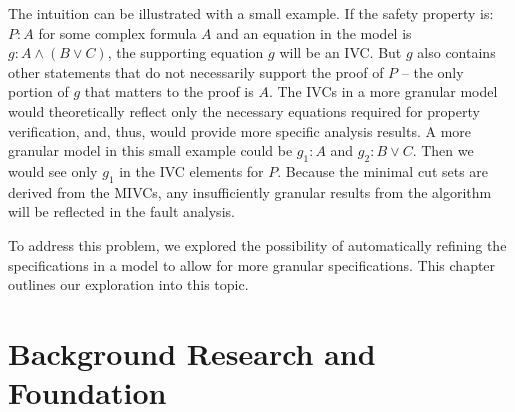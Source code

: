 The intuition can be illustrated with a small example. If the safety property is: $P : A $ for some complex formula $A$ and an equation in the model is $g: A \land (B \lor C)$, the supporting equation $g$ will be an IVC. But $g$ also contains other statements that do not necessarily support the proof of $P$ -- the only portion of $g$ that matters to the proof is $A$. The IVCs in a more granular model would theoretically reflect only the necessary equations required for property verification, and, thus, would provide more specific analysis results. A more granular model in this small example could be $g_1 : A$ and $g_2: B \lor C$. Then we would see only $g_1$ in the IVC elements for $P$. Because the minimal cut sets are derived from the MIVCs, any insufficiently granular results from the \aivcalg algorithm will be reflected in the fault analysis.


To address this problem, we explored the possibility of automatically refining the specifications in a model to allow for more granular specifications. This chapter outlines our exploration into this topic. 

\section{Background Research and Foundation}

